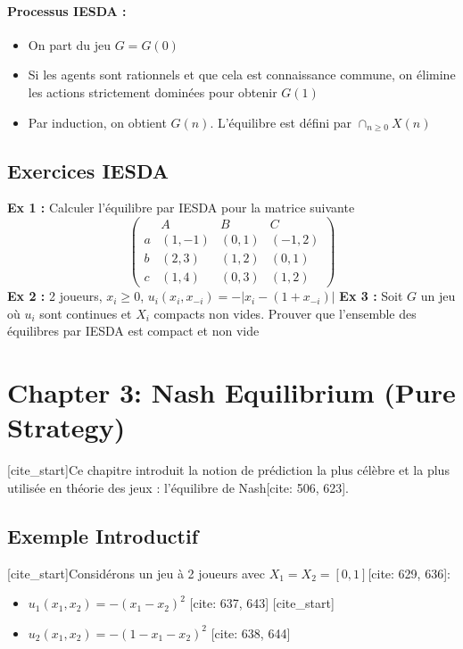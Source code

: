 \paragraph{Processus IESDA :} %
\begin{itemize}
    \item On part du jeu $G = G(0)$ %
    \item Si les agents sont rationnels et que cela est connaissance commune, on élimine les actions strictement dominées pour obtenir $G(1)$ %
    \item Par induction, on obtient $G(n)$. L'équilibre est défini par $\cap_{n \ge 0} X(n)$ %
\end{itemize}

\subsection{Exercices IESDA} %
\textbf{Ex 1 :} Calculer l'équilibre par IESDA pour la matrice suivante %
$$\begin{pmatrix} & A & B & C \\ a & (1,-1) & (0,1) & (-1,2) \\ b & (2,3) & (1,2) & (0,1) \\ c & (1,4) & (0,3) & (1,2) \end{pmatrix}$$ %
\textbf{Ex 2 :} 2 joueurs, $x_i \ge 0$, $u_i(x_i, x_{-i}) = -|x_i - (1+x_{-i})|$ %
\textbf{Ex 3 :} Soit $G$ un jeu où $u_i$ sont continues et $X_i$ compacts non vides. Prouver que l'ensemble des équilibres par IESDA est compact et non vide %


\section{Chapter 3: Nash Equilibrium (Pure Strategy)}

[cite_start]Ce chapitre introduit la notion de prédiction la plus célèbre et la plus utilisée en théorie des jeux : l'équilibre de Nash[cite: 506, 623].

\subsection{Exemple Introductif}

[cite_start]Considérons un jeu à 2 joueurs avec $X_1 = X_2 = [0,1]$[cite: 629, 636]:
\begin{itemize}
    [cite_start]\item $u_1(x_1, x_2) = -(x_1 - x_2)^2$ [cite: 637, 643]
    [cite_start]\item $u_2(x_1, x_2) = -(1 - x_1 - x_2)^2$ [cite: 638, 644]
\end{itemize}


